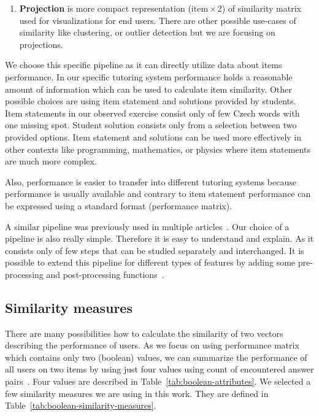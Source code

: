 \documentclass[
  printed, %
  table,   %
  nolof,     %
  nolot,     %
  color,
  final,
  nocover
]{fithesis3}
\begin{document}
\begin{enumerate}
  \item
    \textbf{Projection} is more compact representation (item\,$\times$\,2) of similarity matrix used for visualizations for end users. There are other possible use-cases of similarity like clustering, or outlier detection but we are focusing on projections.
\end{enumerate}


We choose this specific pipeline as it can directly utilize data about items performance. In our specific tutoring system performance holds a reasonable amount of information which can be used to calculate item similarity. Other possible choices are using item statement and solutions provided by students. Item statements in our observed exercise consist only of few Czech words with one missing spot. Student solution consists only from a selection between two provided options. Item statement and solutions can be used more effectively in other contexts like programming, mathematics, or physics where item statements are much more complex.

Also, performance is easier to transfer into different tutoring systems because performance is usually available and contrary to item statement performance can be expressed using a standard format (performance matrix).

A similar pipeline was previously used in multiple articles~\cite{pelanek2018programming, kaser2013cluster}. Our choice of a pipeline is also really simple. Therefore it is easy to understand and explain. As it consists only of few steps that can be studied separately and interchanged. It is possible to extend this pipeline for different types of features by adding some pre-processing and post-processing functions~\cite{kaser2013cluster}.


\subsection{Similarity measures}\label{similarity-measures}

There are many possibilities how to calculate the similarity of two vectors describing the performance of users. As we focus on using performance matrix which contains only two (boolean) values, we can summarize the performance of all users on two items by using just four values using count of encountered answer pairs~\cite{choi2010survey}. Four values are described in Table~\ref{tab:boolean-attributes}. We selected a few similarity measures we are using in this work. They are defined in Table~\ref{tab:boolean-similarity-measures}.
\end{document}
